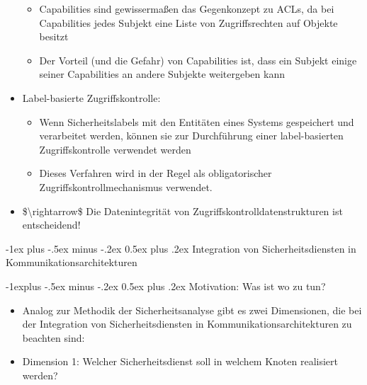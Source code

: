 \documentclass[a4paper]{article}
\makeatletter
\renewcommand{\section}{\@startsection{section}{1}{0mm}%
 {-1ex plus -.5ex minus -.2ex}%
 {0.5ex plus .2ex}%
 {\normalfont\large\bfseries}}
\renewcommand{\subsection}{\@startsection{subsection}{2}{0mm}%
 {-1explus -.5ex minus -.2ex}%
 {0.5ex plus .2ex}%
 {\normalfont\normalsize\bfseries}}
\makeatother
\begin{document}
\begin{multicols}{3}
\begin{itemize}
              \begin{itemize}
                  \item
                        Capabilities sind gewissermaßen das Gegenkonzept zu ACLs, da bei
                        Capabilities jedes Subjekt eine Liste von Zugriffsrechten auf
                        Objekte besitzt
                  \item
                        Der Vorteil (und die Gefahr) von Capabilities ist, dass ein Subjekt
                        einige seiner Capabilities an andere Subjekte weitergeben kann
              \end{itemize}
        \item
              Label-basierte Zugriffskontrolle:

              \begin{itemize}
                  \item
                        Wenn Sicherheitslabels mit den Entitäten eines Systems gespeichert
                        und verarbeitet werden, können sie zur Durchführung einer
                        label-basierten Zugriffskontrolle verwendet werden
                  \item
                        Dieses Verfahren wird in der Regel als obligatorischer
                        Zugriffskontrollmechanismus verwendet.
              \end{itemize}
        \item
              \$\textbackslash rightarrow\$ Die Datenintegrität von
              Zugriffskontrolldatenstrukturen ist entscheidend!
    \end{itemize}


    \section{Integration von Sicherheitsdiensten in
      Kommunikationsarchitekturen}


    \subsection{Motivation: Was ist wo zu
        tun?}

    \begin{itemize}
        \item
              Analog zur Methodik der Sicherheitsanalyse gibt es zwei Dimensionen,
              die bei der Integration von Sicherheitsdiensten in
              Kommunikationsarchitekturen zu beachten sind:
        \item
              Dimension 1: Welcher Sicherheitsdienst soll in welchem Knoten
              realisiert werden?


\end{itemize}
\end{multicols}
\end{document}
